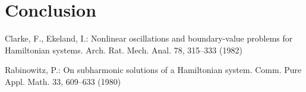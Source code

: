 \documentclass{llncs}
\begin{document}
\section{Conclusion}

%
%

\begin{thebibliography}{5}
%
Clarke, F., Ekeland, I.:
Nonlinear oscillations and
boundary-value problems for Hamiltonian systems.
Arch. Rat. Mech. Anal. 78, 315--333 (1982)

Rabinowitz, P.:
On subharmonic solutions of a Hamiltonian system.
Comm. Pure Appl. Math. 33, 609--633 (1980)

\end{thebibliography}

\clearpage
%
\end{document}
